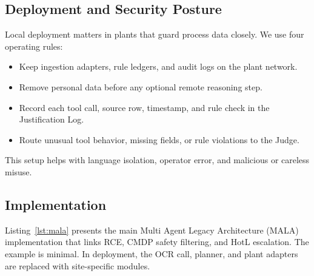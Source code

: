 \documentclass[conference]{IEEEtran}
\newcommand{\MALA}{Multi Agent Legacy Architecture (MALA)}
\begin{document}
\subsection{Deployment and Security Posture}

Local deployment matters in plants that guard process data closely. We use four operating rules:
\begin{itemize}
  \item Keep ingestion adapters, rule ledgers, and audit logs on the plant network.
  \item Remove personal data before any optional remote reasoning step.
  \item Record each tool call, source row, timestamp, and rule check in the Justification Log.
  \item Route unusual tool behavior, missing fields, or rule violations to the Judge.
\end{itemize}

This setup helps with language isolation, operator error, and malicious or careless misuse.


\subsection{Implementation}\label{sec:impl}

Listing~\ref{lst:mala} presents the main \MALA{} implementation that links RCE, CMDP safety filtering, and HotL escalation. The example is minimal. In deployment, the OCR call, planner, and plant adapters are replaced with site-specific modules.
\end{document}
